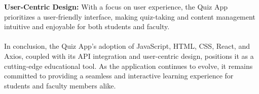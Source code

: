 \textbf{User-Centric Design:} With a focus on user experience, the Quiz App prioritizes a user-friendly interface, making quiz-taking and content management intuitive and enjoyable for both students and faculty.

\large{\paragraph{}}

In conclusion, the Quiz App's adoption of JavaScript, HTML, CSS, React, and Axios, coupled with its API integration and user-centric design, positions it as a cutting-edge educational tool. As the application continues to evolve, it remains committed to providing a seamless and interactive learning experience for students and faculty members alike.
